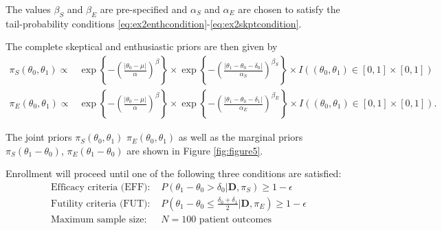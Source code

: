 \documentclass[12pt]{article}
\begin{document}
The values $\beta_S$ and $\beta_E$ are pre-specified and $\alpha_S$ and $\alpha_E$ are chosen to satisfy the tail-probability conditions 
\eqref{eq:ex2enthcondition}-\eqref{eq:ex2skptcondition}.

The complete skeptical and enthusiastic priors are then given by 
\begin{align}
\pi_S(\theta_0,\theta_1)\propto&\exp\left\{-\left(\frac{|\theta_0-\mu|}{\alpha}\right)^{\beta}\right\}\times \exp\left\{-\left(\frac{|\theta_1-\theta_0-\delta_0|}{\alpha_S}\right)^{\beta_S}\right\}\times I((\theta_0,\theta_1)\in [0,1]\times[0,1])\label{eq:ex2skpt}\\
\pi_E(\theta_0,\theta_1)\propto&\exp\left\{-\left(\frac{|\theta_0-\mu|}{\alpha}\right)^{\beta}\right\}\times \exp\left\{-\left(\frac{|\theta_1-\theta_0-\delta_1|}{\alpha_E}\right)^{\beta_E}\right\}\times I((\theta_0,\theta_1)\in [0,1]\times[0,1])\label{eq:ex2enth}.
\end{align}

The joint priors $\pi_S(\theta_0,\theta_1)$ $\pi_E(\theta_0,\theta_1)$ as well as the marginal priors $\pi_S(\theta_1-\theta_0)$, $\pi_E(\theta_1-\theta_0)$ are shown in Figure \ref{fig:figure5}.
%



%				

Enrollment will proceed until one of the following three conditions are satisfied:
\begin{align}
\text{Efficacy criteria (EFF): }&P(\theta_1-\theta_0>\delta_0|\mathbf{D},\pi_S)\geq 1-\epsilon \label{eq:ex2efficacy}\\
\text{Futility criteria (FUT): }&P\left(\theta_1-\theta_0 \leq \frac{\delta_0+\delta_1}{2}\Big|\mathbf{D},\pi_E\right)\geq 1-\epsilon
\label{eq:ex2futility}\\
\text{Maximum sample size: }&N=100 \text{ patient outcomes}\label{eq:ex2maxss}
\end{align}
\end{document}
